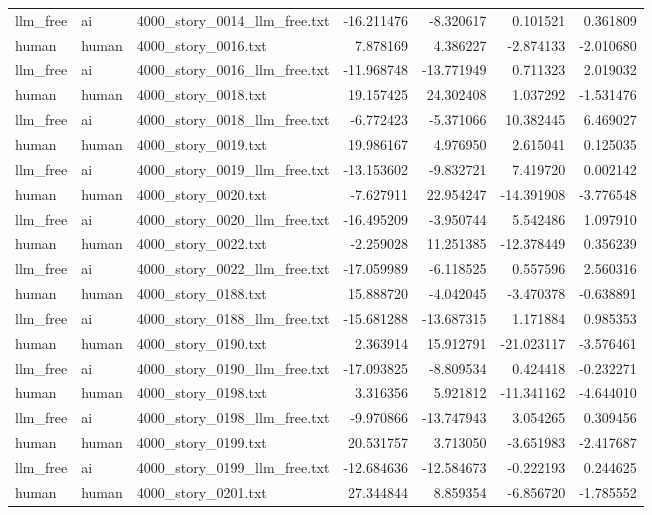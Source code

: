 \begin{longtable}{lllrrrr}
llm\_free & ai & 4000\_story\_0014\_llm\_free.txt & -16.211476 & -8.320617 & 0.101521 & 0.361809 \\
human & human & 4000\_story\_0016.txt & 7.878169 & 4.386227 & -2.874133 & -2.010680 \\
llm\_free & ai & 4000\_story\_0016\_llm\_free.txt & -11.968748 & -13.771949 & 0.711323 & 2.019032 \\
human & human & 4000\_story\_0018.txt & 19.157425 & 24.302408 & 1.037292 & -1.531476 \\
llm\_free & ai & 4000\_story\_0018\_llm\_free.txt & -6.772423 & -5.371066 & 10.382445 & 6.469027 \\
human & human & 4000\_story\_0019.txt & 19.986167 & 4.976950 & 2.615041 & 0.125035 \\
llm\_free & ai & 4000\_story\_0019\_llm\_free.txt & -13.153602 & -9.832721 & 7.419720 & 0.002142 \\
human & human & 4000\_story\_0020.txt & -7.627911 & 22.954247 & -14.391908 & -3.776548 \\
llm\_free & ai & 4000\_story\_0020\_llm\_free.txt & -16.495209 & -3.950744 & 5.542486 & 1.097910 \\
human & human & 4000\_story\_0022.txt & -2.259028 & 11.251385 & -12.378449 & 0.356239 \\
llm\_free & ai & 4000\_story\_0022\_llm\_free.txt & -17.059989 & -6.118525 & 0.557596 & 2.560316 \\
human & human & 4000\_story\_0188.txt & 15.888720 & -4.042045 & -3.470378 & -0.638891 \\
llm\_free & ai & 4000\_story\_0188\_llm\_free.txt & -15.681288 & -13.687315 & 1.171884 & 0.985353 \\
human & human & 4000\_story\_0190.txt & 2.363914 & 15.912791 & -21.023117 & -3.576461 \\
llm\_free & ai & 4000\_story\_0190\_llm\_free.txt & -17.093825 & -8.809534 & 0.424418 & -0.232271 \\
human & human & 4000\_story\_0198.txt & 3.316356 & 5.921812 & -11.341162 & -4.644010 \\
llm\_free & ai & 4000\_story\_0198\_llm\_free.txt & -9.970866 & -13.747943 & 3.054265 & 0.309456 \\
human & human & 4000\_story\_0199.txt & 20.531757 & 3.713050 & -3.651983 & -2.417687 \\
llm\_free & ai & 4000\_story\_0199\_llm\_free.txt & -12.684636 & -12.584673 & -0.222193 & 0.244625 \\
human & human & 4000\_story\_0201.txt & 27.344844 & 8.859354 & -6.856720 & -1.785552 \\

\end{longtable}
